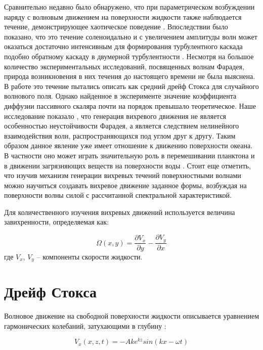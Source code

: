 Сравнительно недавно было обнаружено, что при параметрическом возбуждении наряду с волновым движением на поверхности жидкости также наблюдается течение, демонстрирующее хаотическое поведение \cite{Ramshankar1990}. Впоследствии было показано, что это течение соленоидально и с увеличением амплитуды волн может оказаться достаточно интенсивным для формирования турбулентного каскада \cite{VonKameke2011, Francois2014, Francois2013} подобно обратному каскаду в двумерной турбулентности \cite{Kraichnan1967}. Несмотря на большое количество экспериментальных исследований, посвященных волнам Фарадея, природа возникновения в них течения до настоящего времени не была выяснена. В работе \cite{Mesquita1992} это течение пытались описать как средний дрейф Стокса \cite{Stokes1847} для случайного волнового поля. Однако найденное в эксперименте значение коэффициента диффузии пассивного скаляра почти на порядок превышало теоретическое.	
	Наше исследование показало \cite{F5}, что генерация вихревого движения не является особенностью неустойчивости Фарадея, а является следствием нелинейного взаимодействия волн, распространяющихся под углом друг к другу. Таким образом данное явление уже имеет отношение к движению поверхности океана. В частности оно может играть значительную роль в перемешивании планктона и в движении загрязняющих веществ на поверхности воды \cite{Falkovich2009}.
	Стоит еще отметить, что изучив механизм генерации вихревых течений поверхностными волнами можно научиться создавать вихревое движение заданное формы, возбуждая на поверхности волны силой с рассчитанной спектральной характеристикой.
	
Для количественного изучения вихревых движений используется величина завихренности, определяемая как:

\begin{equation}
 \label{eq:defVort}
\Omega(x, y) = \frac{\partial V_x}{\partial y} - \frac{\partial V_y}{\partial x}
\end{equation}
где $V_x$, $V_y$ – компоненты скорости жидкости. 

\section{Дрейф Стокса} \label{p1_Stockes}

Волновое движение на свободной поверхности жидкости описывается уравнением гармонических колебаний, затухающими в глубину \cite{land}:

\begin{equation}
 \label{eq:waveSimple}
 V_x(x,z,t) = -A k e^{kz}sin(kx-\omega t)
\end{equation}

